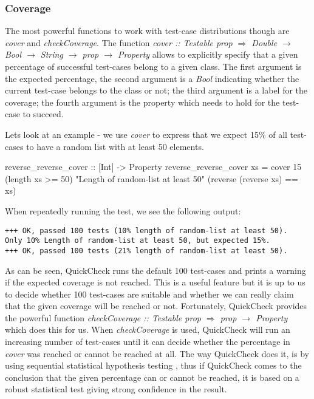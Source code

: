 \subsubsection*{Coverage}
The most powerful functions to work with test-case distributions though are \textit{cover} and \textit{checkCoverage}. The function \textit{cover :: Testable prop $\Rightarrow$ Double $\rightarrow$ Bool $\rightarrow$ String $\rightarrow$ prop $\rightarrow$ Property} allows to explicitly specify that a given percentage of successful test-cases belong to a given class. The first argument is the expected percentage, the second argument is a \textit{Bool} indicating whether the current test-case belongs to the class or not; the third argument is a label for the coverage; the fourth argument is the property which needs to hold for the test-case to succeed. 

Lets look at an example - we use \textit{cover} to express that we expect 15\% of all test-cases to have a random list with at least 50 elements.

\begin{HaskellCode}
reverse_reverse_cover :: [Int] -> Property
reverse_reverse_cover xs  
  = cover 15 (length xs >= 50) "Length of random-list at least 50"
             (reverse (reverse xs) == xs)
\end{HaskellCode}

When repeatedly running the test, we see the following output:

\begin{verbatim}
+++ OK, passed 100 tests (10% length of random-list at least 50).
Only 10% Length of random-list at least 50, but expected 15%.
+++ OK, passed 100 tests (21% length of random-list at least 50).
\end{verbatim}

As can be seen, QuickCheck runs the default 100 test-cases and prints a warning if the expected coverage is not reached. This is a useful feature but it is up to us to decide whether 100 test-cases are suitable and whether we can really claim that the given coverage will be reached or not. Fortunately, QuickCheck provides the powerful function \textit{checkCoverage :: Testable prop $\Rightarrow$ prop $\rightarrow$ Property} which does this for us. When \textit{checkCoverage} is used, QuickCheck will run an increasing number of test-cases until it can decide whether the percentage in \textit{cover} was reached or cannot be reached at all. The way QuickCheck does it, is by using sequential statistical hypothesis testing \cite{wald_sequential_1992}, thus if QuickCheck comes to the conclusion that the given percentage can or cannot be reached, it is based on a robust statistical test giving strong confidence in the result.

